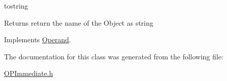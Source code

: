 tostring \begin{DoxyReturn}{Returns}
return the name of the Object as string 
\end{DoxyReturn}


Implements \hyperlink{classOperand_aaa9879d6c4fb8334c1b4d97dad614cef}{Operand}.

The documentation for this class was generated from the following file:\begin{DoxyCompactItemize}
\item 
\hyperlink{OPImmediate_8h}{OPImmediate.h}\end{DoxyCompactItemize}
